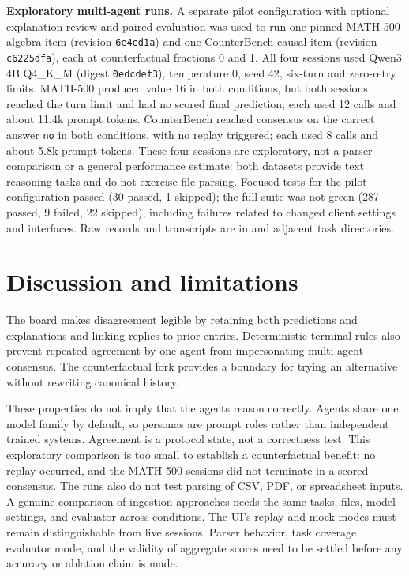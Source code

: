 \documentclass[11pt,a4paper,twocolumn]{article}
\begin{document}
\noindent\textbf{Exploratory multi-agent runs.} A separate pilot configuration with optional explanation review and paired evaluation was used to run one pinned MATH-500 algebra item (revision \texttt{6e4ed1a}) and one CounterBench causal item (revision \texttt{c6225dfa}), each at counterfactual fractions 0 and 1. All four sessions used Qwen3 4B Q4\_K\_M (digest \texttt{0edcdef3}), temperature 0, seed 42, six-turn and zero-retry limits. MATH-500 produced value 16 in both conditions, but both sessions reached the turn limit and had no scored final prediction; each used 12 calls and about 11.4k prompt tokens. CounterBench reached consensus on the correct answer \texttt{no} in both conditions, with no replay triggered; each used 8 calls and about 5.8k prompt tokens. These four sessions are exploratory, not a parser comparison or a general performance estimate: both datasets provide text reasoning tasks and do not exercise file parsing. Focused tests for the pilot configuration passed (30 passed, 1 skipped); the full suite was not green (287 passed, 9 failed, 22 skipped), including failures related to changed client settings and interfaces. Raw records and transcripts are in  and adjacent task directories.
\section{Discussion and limitations}
The board makes disagreement legible by retaining both predictions and explanations and linking replies to prior entries. Deterministic terminal rules also prevent repeated agreement by one agent from impersonating multi-agent consensus. The counterfactual fork provides a boundary for trying an alternative without rewriting canonical history.

These properties do not imply that the agents reason correctly. Agents share one model family by default, so personas are prompt roles rather than independent trained systems. Agreement is a protocol state, not a correctness test. This exploratory comparison is too small to establish a counterfactual benefit: no replay occurred, and the MATH-500 sessions did not terminate in a scored consensus. The runs also do not test parsing of CSV, PDF, or spreadsheet inputs. A genuine comparison of ingestion approaches needs the same tasks, files, model settings, and evaluator across conditions. The UI's replay and mock modes must remain distinguishable from live sessions. Parser behavior, task coverage, evaluator mode, and the validity of aggregate scores need to be settled before any accuracy or ablation claim is made.
\end{document}
